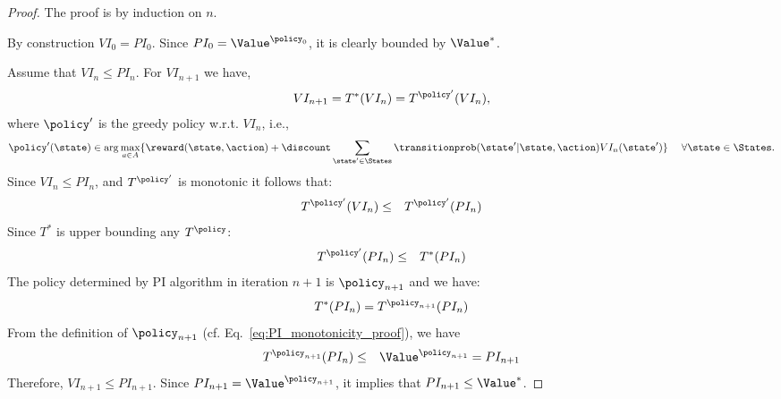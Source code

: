 \begin{proof} The proof is by induction on $n$.

 By construction  $VI_0=PI_0$.
%
Since $PI_0=\Value^{\policy_0}$, it is clearly bounded by
$\Value^*$.

 Assume that $VI_n\leq PI_n$. For
$VI_{n+1}$ we have,
\begin{eqnarray*}
VI_{n+1} = T^*(VI_{n}) = T^{\policy'}(VI_{n}),
\end{eqnarray*}
where  $\policy'$ is the greedy policy w.r.t. $VI_n$, i.e.,
$$
\policy'(\state) \in \arg\max_{a\in A}\{\reward(\state,\action) +
\discount \sum_{\state'\in \States}
\transitionprob(\state'|\state,\action)VI_{n}(\state')\} \quad\;\forall\state\in\States.
$$
Since $VI_n \leq PI_n$, and $T^{\policy'}$ is monotonic it follows
that:
\begin{eqnarray*}
T^{\policy'}(VI_{n}) & \leq &T^{\policy'}(PI_{n})
\end{eqnarray*}
Since $T^*$ is upper bounding any $T^\policy$:
\begin{eqnarray*}
T^{\policy'}(PI_{n}) & \leq & T^*(PI_{n})
\end{eqnarray*}
The policy determined by PI algorithm in iteration $n+1$ is
$\policy_{n+1}$ and we have:
\begin{eqnarray*}
T^*(PI_{n})=T^{\policy_{n+1}}(PI_{n})
\end{eqnarray*}
From the definition of $\policy_{n+1}$ (cf. Eq.~\ref{eq:PI_monotonicity_proof}), we have
\begin{eqnarray*}
T^{\policy_{n+1}}(PI_{n}) &\leq& \Value^{\policy_{n+1}}=PI_{n+1}
\end{eqnarray*}
Therefore, $VI_{n+1} \leq PI_{n+1}$. Since
$PI_{n+1}=\Value^{\policy_{n+1}}$, it implies that $PI_{n+1}\leq
\Value^*$.
\end{proof}



